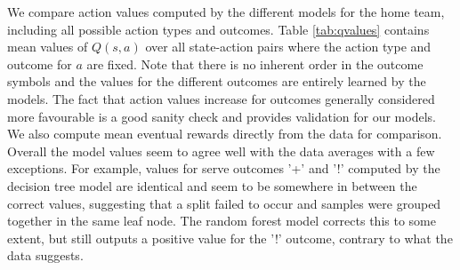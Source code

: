 \documentclass{sfuthesis}
\begin{document}
We compare action values computed by the different models for the home team, including all possible action types and outcomes. Table \ref{tab:qvalues} contains mean values of $Q(s,a)$ over all state-action pairs where the action type and outcome for $a$ are fixed. Note that there is no inherent order in the outcome symbols and the values for the different outcomes are entirely learned by the models. The fact that action values increase for outcomes generally considered more favourable is a good sanity check and provides validation for our models. We also compute mean eventual rewards directly from the data for comparison. Overall the model values seem to agree well with the data averages with a few exceptions. For example, values for serve outcomes '+' and '!' computed by the decision tree model are identical and seem to be somewhere in between the correct values, suggesting that a split failed to occur and samples were grouped together in the same leaf node. The random forest model corrects this to some extent, but still outputs a positive value for the '!' outcome, contrary to what the data suggests.
\end{document}
